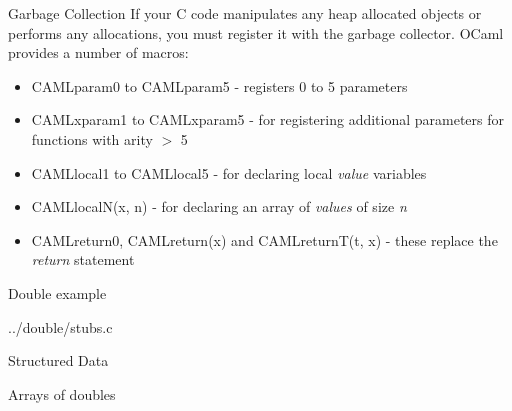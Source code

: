 \documentclass{beamer}
\begin{document}
\begin{frame}{Garbage Collection}
If your C code manipulates any heap allocated objects or performs any allocations, you must
register it with the garbage collector.  OCaml provides a number of macros:
\begin{itemize}
    \item CAMLparam0 to CAMLparam5 - registers 0 to 5 parameters
    \item CAMLxparam1 to CAMLxparam5 - for registering additional parameters for functions with arity $>$ 5
    \item CAMLlocal1 to CAMLlocal5 - for declaring local \emph{value} variables
    \item CAMLlocalN(x, n) - for declaring an array of \emph{values} of size \emph{n}
    \item CAMLreturn0, CAMLreturn(x) and CAMLreturnT(t, x) - these replace the \emph{return} statement
\end{itemize}
\end{frame}

\begin{frame}[fragile]{Double example}
\begin{lstinputlisting}[language=C]{../double/stubs.c}
\end{lstinputlisting}
\end{frame}

\begin{frame}{Structured Data}
\end{frame}

\begin{frame}{Arrays of doubles}
\end{frame}
\end{document}
